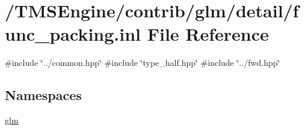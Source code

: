 \hypertarget{func__packing_8inl}{}\section{/\+T\+M\+S\+Engine/contrib/glm/detail/func\+\_\+packing.inl File Reference}
\label{func__packing_8inl}
{\ttfamily \#include \char`\"{}../common.\+hpp\char`\"{}}\newline
{\ttfamily \#include \char`\"{}type\+\_\+half.\+hpp\char`\"{}}\newline
{\ttfamily \#include \char`\"{}../fwd.\+hpp\char`\"{}}\newline
\subsection*{Namespaces}
\begin{DoxyCompactItemize}
\item 
 \hyperlink{namespaceglm}{glm}
\end{DoxyCompactItemize}
